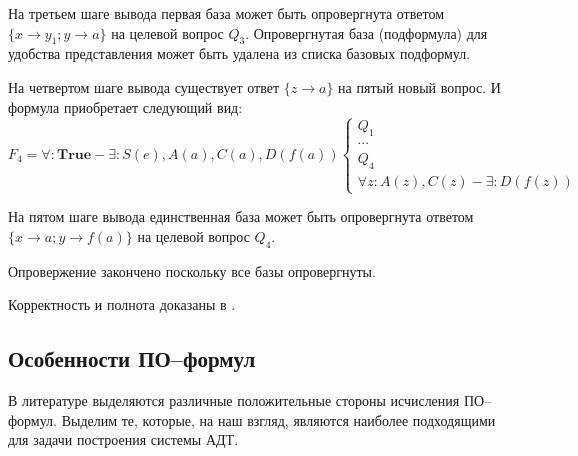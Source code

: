 \begin{example}
На третьем шаге вывода первая база может быть опровергнута ответом $\{x \rightarrow y_1; y \rightarrow a\}$ на целевой вопрос $Q_3$. Опровергнутая база (подформула) для удобства представления может быть удалена из списка базовых подформул.

На четвертом шаге вывода существует ответ $\{z \rightarrow a\}$ на пятый новый вопрос. И формула приобретает следующий вид:
\begin{equation*}\label{ex:f5}
	F_4 = \forall\colon\boldsymbol{True} - \exists\colon S(e),A(a), C(a),D(f(a))
	\left\lbrace
	\begin{array}{l}
		Q_1 \\ \cdots \\ Q_4 \\
		\forall z\colon A(z),C(z) - \exists\colon D(f(z))
	\end{array}\right.
\end{equation*}

На пятом шаге вывода единственная база может быть опровергнута ответом $\{x \rightarrow a; y \rightarrow f(a)\}$ на целевой вопрос $Q_4$.

Опровержение закончено поскольку все базы опровергнуты.

\end{example}

Корректность и полнота доказаны в \cite{}.

\subsection{Особенности ПО--формул}
В литературе выделяются различные положительные стороны исчисления ПО--формул. Выделим те, которые, на наш взгляд, являются наиболее подходящими для задачи построения системы АДТ.


